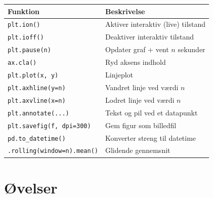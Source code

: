 \documentclass[12pt, a4paper]{article}
\begin{document}
\begin{center}
\begin{tabular}{lp{7cm}}
\toprule
\textbf{Funktion} & \textbf{Beskrivelse} \\
\midrule
\texttt{plt.ion()} & Aktiver interaktiv (live) tilstand \\
\texttt{plt.ioff()} & Deaktiver interaktiv tilstand \\
\texttt{plt.pause(n)} & Opdater graf + vent $n$ sekunder \\
\texttt{ax.cla()} & Ryd aksens indhold \\
\texttt{plt.plot(x, y)} & Linjeplot \\
\texttt{plt.axhline(y=n)} & Vandret linje ved værdi $n$ \\
\texttt{plt.axvline(x=n)} & Lodret linje ved værdi $n$ \\
\texttt{plt.annotate(...)} & Tekst og pil ved et datapunkt \\
\texttt{plt.savefig(f, dpi=300)} & Gem figur som billedfil \\
\texttt{pd.to\_datetime()} & Konverter streng til datetime \\
\texttt{.rolling(window=n).mean()} & Glidende gennemsnit \\
\bottomrule
\end{tabular}
\end{center}

\section{Øvelser}
\end{document}
